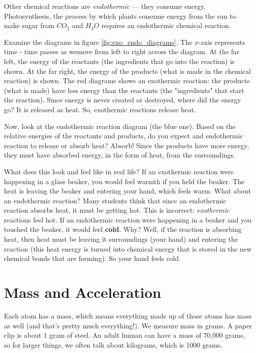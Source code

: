 Other chemical reactions are \textit{endothermic} --- they consume energy.
Photosynthesis, the process by which plants consume energy from the sun to make
sugar from $CO_2$ and $H_2O$ requires an endothermic chemical reaction.

Examine the diagrams in figure \ref{fig:exo_endo_diagrams}. The $x$-axis 
represents time - time passes as wemove from left to right across the diagram. 
At the far left, the energy of the reactants (the ingredients that go into the 
reaction) is shown. At the far right, the energy of the products (what is made in 
the chemical reaction) is shown. The red diagrams shows an exothermic reaction: 
the products (what is made) have less energy than the reactants (the "ingredients"
that start the reaction). Since energy is never created or destroyed, where did 
the energy go? It is released as heat. So, exothermic reactions release heat.

Now, look at the endothermic reaction diagram (the blue one). Based on the
relative energies of the reactants and products, do you expect and endothermic
reaction to release or absorb heat? Absorb! Since the products have more
energy, they must have absorbed energy, in the form of heat, from the surroundings.

What does this look and feel like in real life? If an exothermic reaction were
happening in a glass beaker, you would feel warmth if you held the beaker. The
heat is leaving the beaker and entering your hand, which feels warm. What
about an endothermic reaction? Many students think that since an endothermic
reaction absorbs heat, it must be getting hot. This is incorrect:
\textit{exothermic} reactions feel hot. If an endothermic reaction were
happening in a beaker and you touched the beaker, it would feel \textbf{cold}.
Why? Well, if the reaction is absorbing heat, then heat must be leaving it
surroundings (your hand) and entering the reaction (this heat energy is turned
into chemical energy that is stored in the new chemical bonds that are
forming). So your hand feels cold. %

\section{Mass and Acceleration}

Each atom has a mass, which means everything made up of those atoms has mass as 
well (and that's pretty much everything!). We measure mass in grams. A paper clip 
is about 1 gram of steel. An adult human can have a mass of 70,000 grams, so for 
larger things, we often talk about kilograms, which is 1000 grams.


